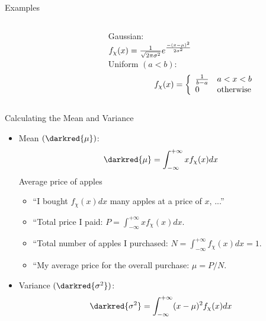 %
%
\begin{slide}{Examples}
\begin{columns}
\begin{column}{0.7\textwidth}
\end{column}
\begin{column}{0.3\textwidth}\scriptsize
Gaussian: \\
$f_{\chi}(x)={1\over \sqrt{2\pi \sigma^2}}e^{-(x-\mu)^2\over 2\sigma^2}$\\
\vspace{15ex}
\hypertarget{unif}{Uniform} $(a<b)$:
$$f_{\chi}(x)=\left\{\begin{array}{ll}
{1\over b-a} & a<x<b \\
0 & \mbox{otherwise}
\end{array}\right.$$
\end{column}
\end{columns}
\end{slide}


%
%
\begin{slide}{Calculating the Mean and Variance}
\begin{itemize}
\item Mean $(\darkred{\mu})$:
\begin{eqnarray}
\darkred{\mu}=\int_{-\infty}^{+\infty}x f_{\chi}(x)dx
\end{eqnarray}
 Average price of apples \\
\begin{itemize}
\item ``I  bought $f_{\chi}(x)dx$ many apples at a price of $x$, ...''
\item ``Total price I paid: $P=\int_{-\infty}^{+\infty}x f_{\chi}(x)dx$.
\item ``Total number of apples I purchased: 
$N=\int_{-\infty}^{+\infty}f_{\chi}(x)dx=1$.
\item ``My average price for the overall purchase: $\mu=P/N$.
\end{itemize}
\item Variance $(\darkred{\sigma^2})$:
\begin{eqnarray}
\darkred{\sigma^2}=\int_{-\infty}^{+\infty}(x-\mu)^2 f_{\chi}(x)dx
\end{eqnarray}
\end{itemize}

\end{slide}


